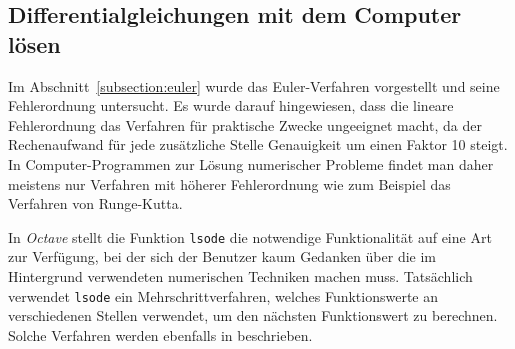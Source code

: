 %
%
%
\subsection{Differentialgleichungen mit dem Computer lösen\label{section:octave}}
Im Abschnitt~\ref{subsection:euler} wurde das Euler-Verfahren
vorgestellt und seine Fehlerordnung untersucht.
Es wurde darauf hingewiesen, dass die lineare Fehlerordnung das Verfahren
für praktische Zwecke ungeeignet macht, da der Rechenaufwand für jede
zusätzliche Stelle Genauigkeit um einen Faktor 10 steigt.
In Computer-Programmen zur Lösung numerischer Probleme findet man daher
meistens nur Verfahren mit höherer Fehlerordnung wie zum Beispiel
das Verfahren von Runge-Kutta.

In {\em Octave} stellt die Funktion \texttt{lsode} die notwendige
Funktionalität auf eine Art zur Verfügung, bei der sich der
Benutzer kaum Gedanken über die im Hintergrund verwendeten
numerischen Techniken machen muss.
Tatsächlich verwendet \texttt{lsode} ein Mehrschrittverfahren, welches
Funktionswerte an verschiedenen Stellen verwendet, um den nächsten
Funktionswert zu berechnen.
Solche Verfahren werden ebenfalls in \cite{skript:mathsem-dgl} beschrieben.

